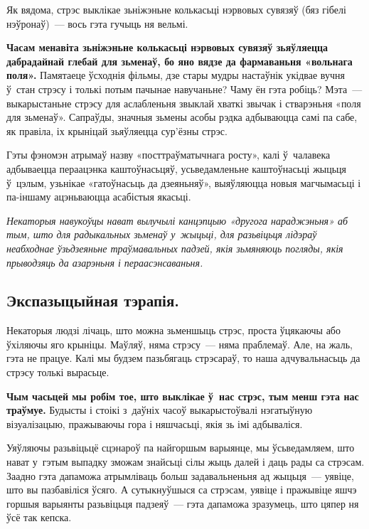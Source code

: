 Як вядома, стрэс выклікае зьніжэньне колькасьці нэрвовых сувязяў (бяз гібелі нэўронаў)~--- вось гэта гучыць ня вельмі.

\textbf{Часам менавіта зьніжэньне колькасьці нэрвовых сувязяў зьяўляецца дабрадайнай глебай для зьменаў, бо яно вядзе да фармаваньня «вольнага поля».} Памятаеце ўсходнія фільмы, дзе стары мудры настаўнік укідвае вучня ў~стан стрэсу і толькі потым пачынае навучаньне? Чаму ён гэта робіць? Мэта~--- выкарыстаньне стрэсу для аслабленьня звыклай хваткі звычак і стварэньня «поля для зьменаў». Сапраўды, значныя зьмены асобы рэдка адбываюцца самі па сабе, як правіла, іх крыніцай зьяўляецца сур'ёзны стрэс.

Гэты фэномэн атрымаў назву «посттраўматычнага росту», калі ў~чалавека адбываецца пераацэнка каштоўнасьцяў, усьведамленьне каштоўнасьці жыцьця ў~цэлым, узьнікае «гатоўнасьць да дзеяньняў», выяўляюцца новыя магчымасьці і па-іншаму ацэньваюцца асабістыя якасьці. 


\emph{Некаторыя навукоўцы нават вылучылі канцэпцыю «другога нараджэньня» аб тым, што для радыкальных зьменаў у~жыцьці, для разьвіцьця лідэраў неабходнае ўзьдзеяньне траўмавальных падзей, якія зьмяняюць погляды, якія прыводзяць да азарэньня і пераасэнсаваньня.}

\subsection*{Экспазыцыйная тэрапія.}

Некаторыя людзі лічаць, што можна зьменшыць стрэс, проста ўцякаючы або ўхіляючы яго крыніцы. Маўляў, няма стрэсу~--- няма праблемаў. Але, на жаль, гэта не працуе. Калі мы будзем пазьбягаць стрэсараў, то наша адчувальнасьць да стрэсу толькі вырасьце. 

\textbf{Чым часьцей мы робім тое, што выклікае ў~нас стрэс, тым менш гэта нас траўмуе.} Будысты і стоікі з~даўніх часоў выкарыстоўвалі нэгатыўную візуалізацыю, пражываючы гора і няшчасьці, якія зь імі адбываліся.

Уяўляючы разьвіцьцё сцэнароў па найгоршым варыянце, мы ўсьведамляем, што нават у~гэтым выпадку зможам знайсьці сілы жыць далей і даць рады са стрэсам. Заадно гэта дапаможа атрымліваць больш задавальненьня ад жыцьця~--- уявіце, што вы пазбавіліся ўсяго. А сутыкнуўшыся са стрэсам, уявіце і пражывіце яшчэ горшыя варыянты разьвіцьця падзеяў~--- гэта дапаможа зразумець, што цяпер ня ўсё так кепска. 

